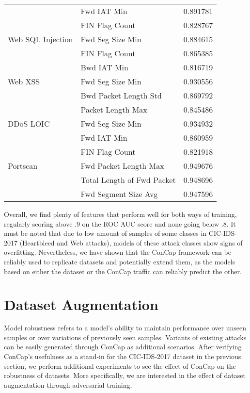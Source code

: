 \documentclass[conference]{IEEEtran}
\begin{document}
\begin{table}
\begin{tabular}{ m{10em}  m{10em} m{8em} }
			{} & Fwd IAT Min & 0.891781\\
			{} & FIN Flag Count & 0.828767\\
			\midrule
			Web SQL Injection & Fwd Seg Size Min & 0.884615\\
			{} & FIN Flag Count & 0.865385\\
			{} & Bwd IAT Min & 0.816719\\
			\midrule
			Web XSS & Fwd Seg Size Min & 0.930556\\
			{} &  Bwd Packet Length Std & 0.869792\\
			{} & Packet Length Max & 0.845486\\
			\midrule
			DDoS LOIC & Fwd Seg Size Min & 0.934932\\
			{} & Fwd IAT Min & 0.860959\\
			{} & FIN Flag Count & 0.821918\\
			\midrule
			Portscan & Fwd Packet Length Max & 0.949676\\
			{} & Total Length of Fwd Packet & 0.948696\\
			{} & Fwd Segment Size Avg & 0.947596\\
			\midrule
		\end{tabular}
		\label{tab:results}
	\end{table}
	
	Overall, we find plenty of features that perform well for both ways of training, regularly scoring above .9 on the ROC AUC score and none going below .8. It must be noted that due to low amount of samples of some classes in CIC-IDS-2017 (Heartbleed and Web attacks), models of these attack classes show signs of overfitting. Nevertheless, we have shown that the ConCap framework can be reliably used to replicate datasets and potentially extend them, as the models based on either the dataset or the ConCap traffic can reliably predict the other.
	
	\section{Dataset Augmentation}\label{augmentation}
	Model robustness refers to a model's ability to maintain performance over unseen samples or over variations of previously seen samples. Variants of existing attacks can be easily generated through ConCap as additional scenarios. 
	After verifying ConCap's usefulness as a stand-in for the CIC-IDS-2017 dataset in the previous section, we perform additional experiments to see the effect of ConCap on the robustness of datasets. More specifically, we are interested in the effect of dataset augmentation through adversarial training.
	
\end{document}

